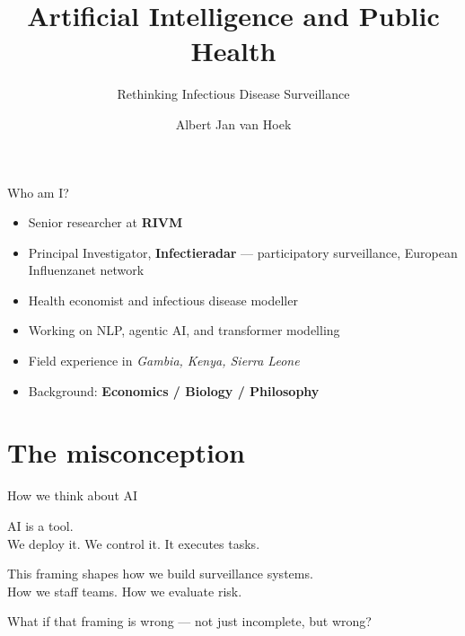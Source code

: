 \documentclass[aspectratio=169, 10pt]{beamer}
\title[AI \& Public Health]{Artificial Intelligence and Public Health}
\subtitle{Rethinking Infectious Disease Surveillance}
\author{Albert Jan van Hoek}
\institute{RIVM — Dutch National Institute for Public Health and the Environment}
\date{}
\begin{document}
\begin{frame}[plain]
  \vspace{1.5cm}
  \titlepage
\end{frame}

\begin{frame}{Who am I?}
  \begin{itemize}
    \item Senior researcher at \textbf{RIVM}
    \item Principal Investigator, \textbf{Infectieradar} —
          participatory surveillance, European Influenzanet network
    \item Health economist and infectious disease modeller
    \item Working on NLP, agentic AI, and transformer modelling
    \item Field experience in \textit{Gambia, Kenya, Sierra Leone}
    \item Background: \textbf{Economics / Biology / Philosophy}
  \end{itemize}
\end{frame}

\section{The misconception}

\begin{frame}{How we think about AI}
  \begin{block}{}
    AI is a tool.\\[0.4em]
    We deploy it. We control it. It executes tasks.
  \end{block}

  \pause
  \bigskip

  This framing shapes how we build surveillance systems.\\
  How we staff teams. How we evaluate risk.\\[0.5em]

  \begin{alertblock}{}
    \centering
    What if that framing is wrong — not just incomplete, but wrong?
  \end{alertblock}
\end{frame}
\end{document}
